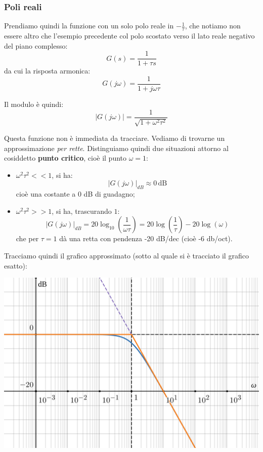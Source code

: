 \documentclass[a4paper,11pt]{article}
\begin{document}
\par\bigskip

\subsubsection{Poli reali}
Prendiamo quindi la funzione con un solo polo reale in $-\frac{1}{\tau}$, che notiamo non essere altro che l'esempio precedente col polo scostato verso il lato reale negativo del piano complesso:
$$
G(s) = \frac{1}{1 + \tau s} 
$$
da cui la risposta armonica:
$$
G(j \omega) = \frac{1}{1 + j \omega \tau}
$$

Il modulo è quindi:
$$
|G(j \omega)| = \frac{1}{\sqrt{1 + \omega^2 \tau^2}}
$$

Questa funzione non è immediata da tracciare.
Vediamo di trovarne un approssimazione \textit{per rette}.
Distinguiamo quindi due situazioni attorno al cosiddetto \textbf{punto critico}, cioè il punto $\omega = 1$:
\begin{itemize}
	\item $\omega^2 \tau^2 << 1$, si ha:
		$$
		|G(j\omega)|_{dB} \approx 0 \, \mathrm{dB}
		$$
		cioè una costante a 0 dB di guadagno;
	\item $\omega^2 \tau^2 >> 1$, si ha, trascurando $1$:
		$$
		|G(j \omega)|_{dB} = 20 \log_{10} \left( \frac{1}{\omega \tau} \right) =
		20 \log \left( \frac{1}{\tau} \right) - 20 \log \left( \omega \right)
		$$
		che per $\tau = 1$ dà una retta con pendenza -20 dB/dec (cioè -6 db/oct).
\end{itemize}

\par\bigskip

\noindent
\begin{minipage}{\textwidth}
Tracciamo quindi il grafico approssimato (sotto al quale si è tracciato il grafico esatto):
\begin{center}
	\includegraphics[scale=0.3]{../figures/lowpass_bode/mod.png}
\end{center}
\end{minipage}
\end{document}
